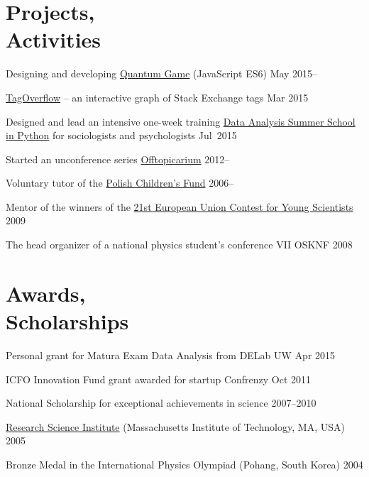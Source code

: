 \documentclass[margin,line]{resume}
\begin{document}
\begin{resume}

    \section{\mysidestyle Projects,\\Activities}

    \begin{list2}
        \item Designing and developing \href{http://quantumgame.io/}{Quantum Game} (JavaScript ES6) \hfill {May 2015--}
        \item \href{http://p.migdal.pl/tagoverflow}{TagOverflow} -- an interactive graph of Stack Exchange tags \hfill {Mar 2015}
        \item Designed and lead an intensive one-week training \href{http://www.delab.uw.edu.pl/szkola-letnia-dane-2015/}{Data Analysis Summer School in Python} for sociologists and psychologists \hfill { Jul~2015}
        \item Started an unconference series \href{http://offtopicarium.wikidot.com/}{Offtopicarium} \hfill { 2012--}
        \item Voluntary tutor of the \href{http://crastina.se/gifted-children-in-poland-by-piotr-migdal/}{Polish Children's Fund} \hfill { 2006--}
        \item Mentor of the winners of the \href{http://www.eucys09.fr/}{21st European Union Contest for Young Scientists}\hfill { 2009}
        \item The head organizer of a national physics student's conference VII OSKNF \hfill { 2008}
    \end{list2}


    \section{\mysidestyle Awards,\\Scholarships\\}
    \begin{list2}
        \item Personal grant for Matura Exam Data Analysis from DELab UW \hfill {Apr 2015}
    	\item ICFO Innovation Fund grant awarded for startup Confrenzy \hfill { Oct 2011}
        \item National Scholarship for exceptional achievements in science \hfill { 2007--2010}
        \item \href{http://www.cee.org/research-science-institute}{Research Science Institute} (Massachusetts Institute of Technology, MA, USA) \hfill { 2005}
        \item Bronze Medal in the International Physics Olympiad (Pohang, South Korea) \hfill { 2004}
    \end{list2}


\end{resume}
\end{document}

